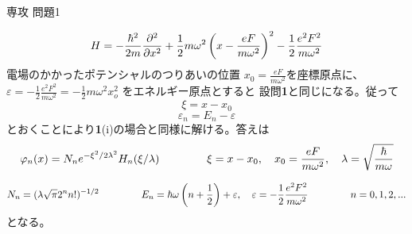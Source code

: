 \documentclass[fleqn]{jbook}
\begin{document}
\begin{answer}{専攻 問題1}{}
\begin{subanswers}
\begin{subsubanswers}
  \SubSubAnswer
%
    \[ H = -\frac{\hbar^2}{2m} \Partial{^2}{x^2}%
           +\frac{1}{2}m\omega^2\left(x-\frac{eF}{m\omega^2}\right)^2%
           -\frac{1}{2}\frac{e^2 F^2}{m\omega^2} \]
%
    電場のかかったポテンシャルのつりあいの位置
    $x_0=\frac{eF}{m\omega^2}$を座標原点に、
    $\varepsilon = -\frac{1}{2} \frac{e^2 F^2}{m \omega ^2}%
    = -\frac{1}{2} m \omega^2 x_o^2$ をエネルギー原点とすると 
    設問{\bf 1}と同じになる。従って
%
    \[ \xi=x-x_0 \]
    \[ \varepsilon_n=E_n-\varepsilon \]
%
    とおくことにより{\bf 1}(i)の場合と同様に解ける。答えは
%
    \[ \varphi_n(x) = N_n e^{-\xi^2/2\lambda^2}H_n(\xi/\lambda)%
       \hspace{15mm}%
       \xi=x-x_0,\quad x_0 = \frac{eF}{m\omega^2}, \quad%
       \lambda=\sqrt{\frac{\hbar}{m\omega}} \]

    \[ N_n=(\lambda \sqrt{\pi} 2^n n!)^{-1/2}%
       \hspace{15mm}%
       E_n=\hbar \omega \left( n+\frac{1}{2} \right)+\varepsilon, \quad%
       \varepsilon = -\frac{1}{2} \frac{e^2 F^2}{m \omega ^2}%
       \hspace{15mm}%
       n=0,1,2,... \]
%
    となる。

  \end{subsubanswers}


\end{subanswers}
\end{answer}
\end{document}
